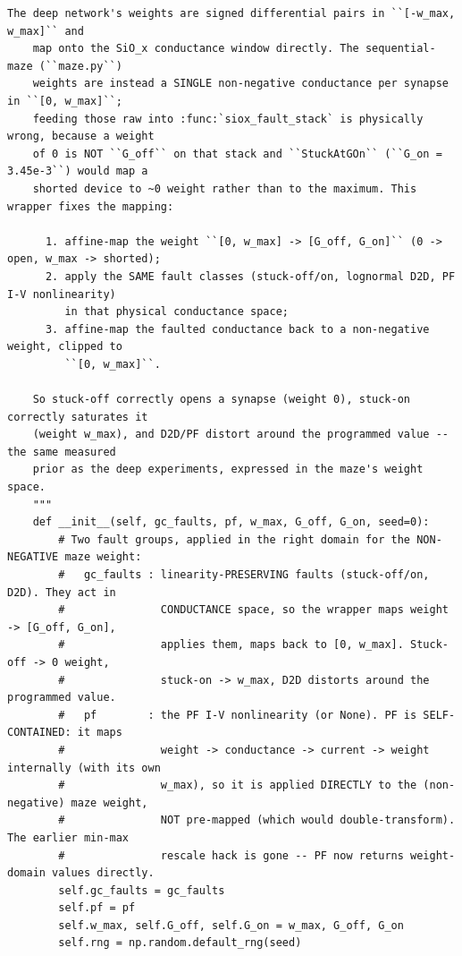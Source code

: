 \begin{lstlisting}[caption={mrl\_trace/device\_faults.py},label={lst:siox-src-device_faults}]
    The deep network's weights are signed differential pairs in ``[-w_max, w_max]`` and
    map onto the SiO_x conductance window directly. The sequential-maze (``maze.py``)
    weights are instead a SINGLE non-negative conductance per synapse in ``[0, w_max]``;
    feeding those raw into :func:`siox_fault_stack` is physically wrong, because a weight
    of 0 is NOT ``G_off`` on that stack and ``StuckAtGOn`` (``G_on = 3.45e-3``) would map a
    shorted device to ~0 weight rather than to the maximum. This wrapper fixes the mapping:

      1. affine-map the weight ``[0, w_max] -> [G_off, G_on]`` (0 -> open, w_max -> shorted);
      2. apply the SAME fault classes (stuck-off/on, lognormal D2D, PF I-V nonlinearity)
         in that physical conductance space;
      3. affine-map the faulted conductance back to a non-negative weight, clipped to
         ``[0, w_max]``.

    So stuck-off correctly opens a synapse (weight 0), stuck-on correctly saturates it
    (weight w_max), and D2D/PF distort around the programmed value -- the same measured
    prior as the deep experiments, expressed in the maze's weight space.
    """
    def __init__(self, gc_faults, pf, w_max, G_off, G_on, seed=0):
        # Two fault groups, applied in the right domain for the NON-NEGATIVE maze weight:
        #   gc_faults : linearity-PRESERVING faults (stuck-off/on, D2D). They act in
        #               CONDUCTANCE space, so the wrapper maps weight -> [G_off, G_on],
        #               applies them, maps back to [0, w_max]. Stuck-off -> 0 weight,
        #               stuck-on -> w_max, D2D distorts around the programmed value.
        #   pf        : the PF I-V nonlinearity (or None). PF is SELF-CONTAINED: it maps
        #               weight -> conductance -> current -> weight internally (with its own
        #               w_max), so it is applied DIRECTLY to the (non-negative) maze weight,
        #               NOT pre-mapped (which would double-transform). The earlier min-max
        #               rescale hack is gone -- PF now returns weight-domain values directly.
        self.gc_faults = gc_faults
        self.pf = pf
        self.w_max, self.G_off, self.G_on = w_max, G_off, G_on
        self.rng = np.random.default_rng(seed)


\end{lstlisting}
